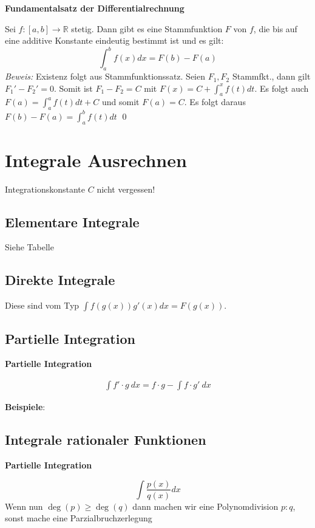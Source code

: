 \documentclass[25pt]{sciposter}
\newcommand{\R}{\mathbb{R}}
\newenvironment{method}[1]{\begin{mdframed}[backgroundcolor=blue!10,innertopmargin=15pt, innerbottommargin=15pt, nobreak=true]
		\textbf{#1 }
	}
	{ 
	\end{mdframed}
}
\newenvironment{important}{\begin{mdframed}[backgroundcolor=red!50,innertopmargin=15pt, innerbottommargin=15pt, nobreak=true]
		\Large
	}
	{ 
	\end{mdframed}
}
\begin{document}
\begin{multicols}{3}
\begin{method}{Fundamentalsatz der Differentialrechnung}
Sei $f:[a,b] \to \R$ stetig. Dann gibt es eine Stammfunktion $F$ von $f$, die bis auf eine additive Konstante eindeutig bestimmt ist und es gilt:
$$\int_{a}^{b} f(x) dx = F(b) - F(a)$$
\textit{Beweis:} Existenz folgt aus Stammfunktionssatz. Seien $F_1, F_2$ Stammfkt., dann gilt $F_1' - F_2' = 0$. Somit ist $F_1 - F_2 = C$ mit $F(x) = C + \int_{a}^{x} f(t) dt$. Es folgt auch $F(a) = \int_{a}^{a} f(t) dt + C$ und somit $F(a) = C$. Es folgt daraus $F(b)-F(a) = \int_{a}^{b} f(t) dt$ \qed 
\end{method}


\section*{Integrale Ausrechnen}

\begin{important}
Integrationskonstante $C$ nicht vergessen!
\end{important}

\subsection*{Elementare Integrale}
Siehe Tabelle

\subsection*{Direkte Integrale}
Diese sind vom Typ $\int f(g(x)) g'(x) dx = F(g(x))$.

\subsection*{Partielle Integration}
\begin{method}{Partielle Integration}
\begin{align*}
	\int f' \cdot g \ dx = f \cdot g - \int f \cdot g' \  dx
\end{align*}
\end{method}
\textbf{Beispiele}:


\subsection*{Integrale rationaler Funktionen}
\begin{method}{Partielle Integration}
	$$\int \frac{p(x)}{q(x)} dx$$
	Wenn nun $\deg(p) \geq \deg(q)$ dann machen wir eine Polynomdivision $p:q$, sonst mache eine Parzialbruchzerlegung
\end{method}


\end{multicols}
\end{document}
